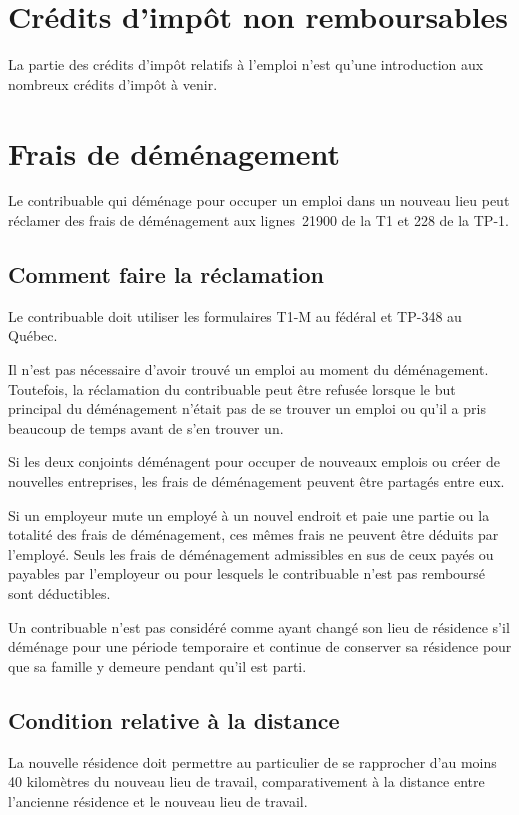 \section{Crédits d'impôt non remboursables}
La partie des crédits d'impôt relatifs à l'emploi n'est qu'une introduction aux nombreux crédits d'impôt à venir.



\section{Frais de déménagement}
Le contribuable qui déménage pour occuper un emploi dans un nouveau lieu peut réclamer des frais de déménagement aux lignes~21900 de la T1 et 228 de la TP-1.


\subsection{Comment faire la réclamation}
Le contribuable doit utiliser les formulaires T1-M au fédéral et TP-348 au Québec.

Il n'est pas nécessaire d'avoir trouvé un emploi au moment du déménagement. Toutefois, la réclamation du contribuable peut être refusée lorsque le but principal du déménagement n'était pas de se trouver un emploi ou qu'il a pris beaucoup de temps avant de s'en trouver un.

Si les deux conjoints déménagent pour occuper de nouveaux emplois ou créer de nouvelles entreprises, les frais de déménagement peuvent être partagés entre eux.

Si un employeur mute un employé à un nouvel endroit et paie une partie ou la totalité des frais de déménagement, ces mêmes frais ne peuvent être déduits par l'employé. Seuls les frais de déménagement admissibles en sus de ceux payés ou payables par l'employeur ou pour lesquels le contribuable n'est pas remboursé sont déductibles.

Un contribuable n'est pas considéré comme ayant changé son lieu de résidence s'il déménage pour une période temporaire et continue de conserver sa résidence pour que sa famille y demeure pendant qu'il est parti.


\subsection{Condition relative à la distance}
La nouvelle résidence doit permettre au particulier de se rapprocher d'au moins 40 kilomètres du nouveau lieu de travail, comparativement à la distance entre l'ancienne résidence et le nouveau lieu de travail.


